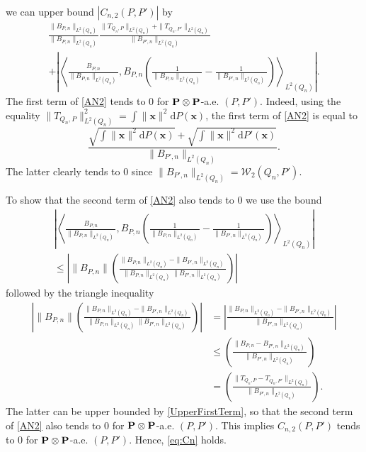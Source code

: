 \documentclass{imsart}
\numberwithin{equation}{section}
\def\x{\mathbf{x}}
\def\x{\mathbf x}
\begin{document}
we can upper bound $|C_{n,2}(P,P')|$ by 
\begin{multline} \label{AN2}
	\frac{  \|B_{P,n}\|_{L^2(Q_n)}}{\|B_{P,n}\|_{L^2(Q_n)}}  \frac{  \|T_{Q_n,P}\|_{L^2(Q_n)}+\|T_{Q_n, P'}\|_{L^2(Q_n)}}{\|B_{P',n}\|_{L^2(Q_n)}}  \\
	+  \left\vert   \left\langle \frac{  B_{P,n}}{\|B_{P,n}\|_{L^2(Q_n)}},B_{P,n}\left(\frac{1}{\|B_{P,n}\|_{L^2(Q_n)}}-\frac{1}{\|B_{P',n}\|_{L^2(Q_n)}}  \right)\right\rangle_{L^2(Q_n)} \right\vert. 
\end{multline}
The first term of \eqref{AN2} tends to $0$ for ${\bf P }\otimes {\bf P}$-a.e. $(P,P')$. Indeed, using the equality $ \|T_{Q_n,P}\|_{L^2(Q_n)}^2 = \int \|\x\|^2 \mathrm{d}P(\x) $, the first term of \eqref{AN2} is equal to 
\begin{equation}
	\label{UpperFirstTerm}
	\frac{ \sqrt{\int \|\x\|^2 \mathrm{d}P(\x)}+\sqrt{\int \|\x\|^2 \mathrm{d}P'(\x)}}{\|B_{P',n}\|_{L^2(Q_n)}}.
\end{equation}
The latter clearly tends to $0$ since $\|B_{P',n}\|_{L^2(Q_n)}= \mathcal{W}_2(Q_n,P')$. 

To show that  the second term of \eqref{AN2} also tends to $0$ we use the bound 
\begin{multline*}
	\left\vert   \left\langle \frac{  B_{P,n}}{\|B_{P,n}\|_{L^2(Q_n)}},B_{P,n}\left(\frac{1}{\|B_{P,n}\|_{L^2(Q_n)}}-\frac{1}{\|B_{P',n}\|_{L^2(Q_n)}}  \right)\right\rangle_{L^2(Q_n)} \right\vert\\
	\leq \left\vert    \|B_{P,n}\| \left(\frac{\|B_{P,n}\|_{L^2(Q_n)}-\|B_{P',n}\|_{L^2(Q_n)} }{\|B_{P,n}\|_{L^2(Q_n)} \|B_{P',n}\|_{L^2(Q_n)}}  \right) \right\vert
\end{multline*}
followed by the  triangle inequality
\begin{align*}
	\left\vert    \|B_{P,n}\| \left(\frac{\|B_{P,n}\|_{L^2(Q_n)}-\|B_{P',n}\|_{L^2(Q_n)} }{\|B_{P,n}\|_{L^2(Q_n)} \|B_{P',n}\|_{L^2(Q_n)}}  \right) \right\vert &=   \left|\frac{\|B_{P,n}\|_{L^2(Q_n)}-\|B_{P',n}\|_{L^2(Q_n)} }{\|B_{P',n}\|_{L^2(Q_n)}}  \right|\\
	&\leq   \left(\frac{\|B_{P,n}-B_{P',n}\|_{L^2(Q_n)} }{\|B_{P',n}\|_{L^2(Q_n)}}  \right)\\
	&=   \left(\frac{\|T_{Q_n,P}-T_{Q_n,P'}\|_{L^2(Q_n)} }{\|B_{P',n}\|_{L^2(Q_n)}}  \right).
\end{align*}
The latter can be upper bounded by \eqref{UpperFirstTerm}, so that the second term of \eqref{AN2} also tends to $0$ for ${\bf P }\otimes {\bf P}$-a.e. $(P,P')$. This implies $C_{n,2}(P,P')$ tends to $0$ for ${\bf P }\otimes {\bf P}$-a.e. $(P,P')$. Hence, \eqref{eq:Cn} holds. 
\end{document}
